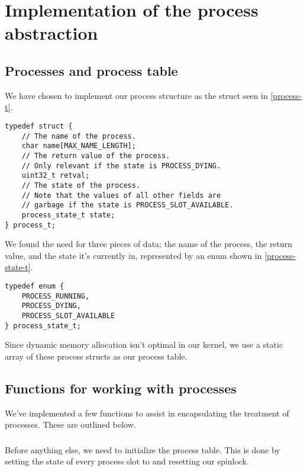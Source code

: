 \section{Implementation of the process abstraction}

\subsection{Processes and process table}

We have chosen to implement our process structure as the struct seen in
\autoref{process-t}.

\lstset{caption=The process structure.,label=process-t,float}
\begin{lstlisting}
typedef struct {
    // The name of the process.
    char name[MAX_NAME_LENGTH];
    // The return value of the process.
    // Only relevant if the state is PROCESS_DYING.
    uint32_t retval;
    // The state of the process.
    // Note that the values of all other fields are
    // garbage if the state is PROCESS_SLOT_AVAILABLE.
    process_state_t state;
} process_t;
\end{lstlisting}

We found the need for three pieces of data; the name of the
process, the return value, and the state it's currently in, represented
by an enum shown in \autoref{process-state-t}.

\lstset{caption=The process state enum.,label=process-state-t,float}
\begin{lstlisting}
typedef enum {
    PROCESS_RUNNING,
    PROCESS_DYING,
    PROCESS_SLOT_AVAILABLE
} process_state_t;
\end{lstlisting}

Since dynamic memory allocation isn't optimal in our kernel, we use a
static array of these process structs as our process table.

\subsection{Functions for working with processes}

We've implemented a few functions to assist in encapsulating the
treatment of processes. These are outlined below.

\subsubsection{}
Before anything else, we need to initialize the process table. This is done by
setting the state of every process slot to  and
resetting our spinlock.

